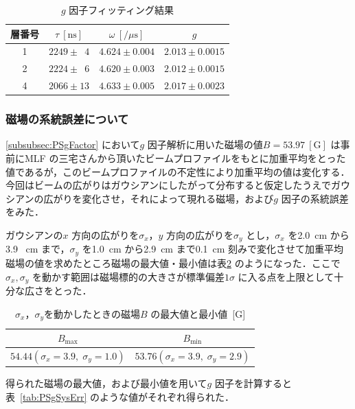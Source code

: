 \begin{table}[h]
	\centering
	\caption{$g$ 因子フィッティング結果}
	\begin{tabular}{cccc} \toprule
	層番号 & $\tau~[\mathrm{ns}]$ & $\omega~[/ \mu\mathrm{s}]$ & $g$ \\ \midrule
	1 & $2249 \pm \phantom{0}4$ & $4.624 \pm 0.004$ & $2.013 \pm 0.0015$ \\  
	2 & $2224 \pm \phantom{0}6$ & $4.620 \pm 0.003$ & $2.012 \pm 0.0015$ \\  
	4 & $2066 \pm 13$ & $4.633 \pm 0.005$ & $2.017 \pm 0.0023$ \\  \bottomrule
	\end{tabular}\label{tab:PSgFactor}
\end{table}%

\newpage

\subsubsection{磁場の系統誤差について}
\label{subsubsec:MagSysErr}
\ref{subsubsec:PSgFactor} において$g$ 因子解析に用いた磁場の値$B = 53.97~[\mathrm{G}]$ は事前にMLF の三宅さんから頂いたビームプロファイルをもとに加重平均をとった値であるが，このビームプロファイルの不定性により加重平均の値は変化する．今回はビームの広がりはガウシアンにしたがって分布すると仮定したうえでガウシアンの広がりを変化させ，それによって現れる磁場，および$g$ 因子の系統誤差をみた．

ガウシアンの$x$ 方向の広がりを$\sigma_{x}$，$y$ 方向の広がりを$\sigma_{y}$ とし，$\sigma_{x}$ を2.0~cm から3.9 ~cm まで，$\sigma_{y}$ を1.0~cm から2.9~cm まで0.1~cm 刻みで変化させて加重平均磁場の値を求めたところ磁場の最大値・最小値は表\ref{tab:MagSysErr} のようになった．ここで$\sigma_{x}, \sigma_{y}$ を動かす範囲は磁場標的の大きさが標準偏差$1\sigma$ に入る点を上限として十分な広さをとった．

\begin{table}[h]
	\centering
	\caption{$\sigma_{x}$，$\sigma_{y}$を動かしたときの磁場$B$ の最大値と最小値~[G]}
	\begin{tabular}{cc}\toprule
	$B_{\mathrm{max}}$ & $B_{\mathrm{min}}$ \\ \midrule
	$54.44 (\sigma_{x} = 3.9, \;\sigma_{y} = 1.0)$ & $53.76 (\sigma_{x} = 3.9, \;\sigma_{y} = 2.9)$ \\ \bottomrule 	
	\end{tabular}\label{tab:MagSysErr}
\end{table}%

得られた磁場の最大値，および最小値を用いて$g$ 因子を計算すると表~\ref{tab:PSgSysErr} のような値がそれぞれ得られた．

